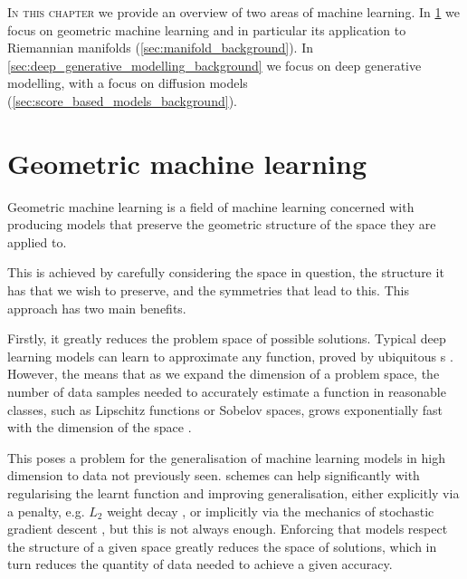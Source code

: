 \lettrine{I}{n this chapter} we provide an overview of two areas of machine learning.
In \cref{sec:geometric_machine_learning} we focus on geometric machine learning and in particular its application to Riemannian manifolds (\cref{sec:manifold_background}).
In \cref{sec:deep_generative_modelling_background} we focus on deep generative modelling, with a focus on diffusion models (\cref{sec:score_based_models_background}).


\section{Geometric machine learning}
\label{sec:geometric_machine_learning}
Geometric machine learning is a field of machine learning concerned with producing models that preserve the geometric structure of the space they are applied to.

This is achieved by carefully considering the space in question, the structure it has that we wish to preserve, and the symmetries that lead to this. 
This approach has two main benefits.

Firstly, it greatly reduces the problem space of possible solutions.
Typical deep learning models can learn to approximate any function, proved by ubiquitous s \cite{cybenko1989approximation,leshno1993multilayer,ismailov2023three,maiorov1999lower}.
However, the  \cite{bellman1957dynamic} means that as we expand the dimension of a problem space, the number of data samples needed to accurately estimate a function in reasonable classes, such as Lipschitz functions or Sobelov spaces, grows exponentially fast with the dimension of the space \cite{tsybakov2009nonparametric}.

This poses a problem for the generalisation of machine learning models in high dimension to data not previously seen.
 schemes can help significantly with regularising the learnt function and improving generalisation, either explicitly via a penalty, e.g. \(L_2\) weight decay \cite{krogh1991simple}, or implicitly via the mechanics of stochastic gradient descent \cite{vardi2021implicit}, but this is not always enough.
Enforcing that models respect the structure of a given space greatly reduces the space of solutions, which in turn reduces the quantity of data needed to achieve a given accuracy.

